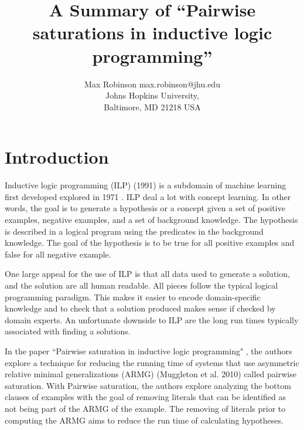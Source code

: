 \documentclass[jair,twoside,11pt,theapa]{article}
\begin{document}
\title{A Summary of ``Pairwise saturations in inductive logic programming''}


\author{\name Max Robinson \email max.robinson@jhu.edu \\
       \addr Johns Hopkins University,\\
       Baltimore, MD 21218 USA
   }


\maketitle


\section{Introduction}
\label{Introduction}
Inductive logic programming (ILP) (1991) is a subdomain of machine learning first developed explored in 1971 \cite{Plokin}. ILP deal a lot with concept learning. In other words, the goal is to generate a hypothesis or a concept given a set of positive examples, negative examples, and a set of background knowledge. The hypothesis is described in a logical program using the predicates in the background knowledge. The goal of the hypothesis is to be true for all positive examples and false for all negative example. 

One large appeal for the use of ILP is that all data used to generate a solution, and the solution are all human readable. All pieces follow the typical logical programming paradigm. This makes it easier to encode domain-specific knowledge and to check that a solution produced makes sense if checked by domain experts. An unfortunate downside to ILP are the long run times typically associated with finding a solutions. 

In the paper ``Pairwise saturation in inductive logic programming" \cite{Drole2017}, the authors explore a technique for reducing the running time of systems that use asymmetric relative minimal generalizations (ARMG) (Muggleton et al. 2010) called pairwise saturation. With Pairwise saturation, the authors explore analyzing the bottom clauses of examples with the goal of removing literals that can be identified as not being part of the ARMG of the example. The removing of literals prior to computing the ARMG aims to reduce the run time of calculating hypotheses.
\end{document}
